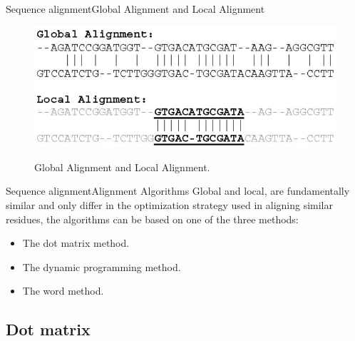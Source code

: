 \documentclass[10pt]{beamer}
\begin{document}
{%
\begin{frame}{Sequence alignment}{Global Alignment and Local Alignment}
\begin{figure}[]
 \centering
    \includegraphics[width=\textwidth,height=0.7\textheight,keepaspectratio]{img/alignment/alig.jpg}
    \label{img:alig}
    \caption{Global Alignment and Local Alignment.}
\end{figure}
\end{frame}

\begin{frame}{Sequence alignment}{Alignment Algorithms}
Global and local, are fundamentally similar and only differ in the optimization strategy used in aligning similar residues, the algorithms can be based on one of the three methods:
\begin{itemize}
    \item The dot matrix method.
    \item The dynamic programming method.
    \item The word method.
\end{itemize}
\end{frame}

\subsection{Dot matrix}                                 %

}
\end{document}
